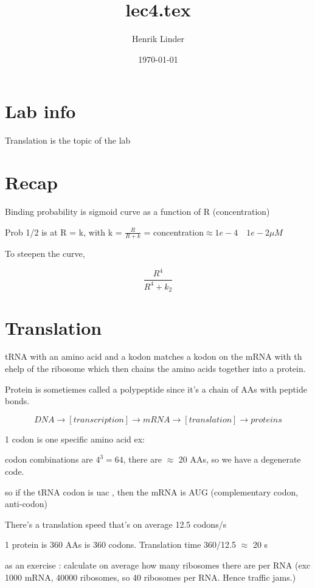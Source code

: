 \documentclass{article}
\title{lec4.tex }
\author{Henrik Linder}
\date{\today}
\begin{document}
\maketitle


\section{Lab info}
Translation is the topic of the lab 

\section{Recap}
Binding probability is sigmoid curve as a function of R (concentration)

Prob 1/2 is at R = k, with k = $\frac{R}{R + k}$ = concentration$\approx 1e-4 \quad 1e-2 \mu M$


To steepen the curve, 

\begin{equation}
	\frac{R ^ 4}{R ^ 4 + k_2}
\end{equation}



\section{Translation}
tRNA with an amino acid and a kodon matches a kodon on the mRNA with th ehelp of the ribosome which then chains the amino acids together into a protein. 


Protein is sometiemes called a polypeptide since it's a chain of AAs with peptide bonds. 

\begin{equation}
	DNA \longrightarrow [transcription] \longrightarrow mRNA \longrightarrow [translation] \longrightarrow proteins
\end{equation}

1 codon is one specific amino acid 
ex: 


codon combinations are $4^3 = 64$, there are $\approx$ 20 AAs, so we have a degenerate code. 

so if the tRNA codon is uac , then the mRNA is AUG (complementary codon, anti-codon)

There's a translation speed that's on average 12.5 codons/s

1 protein is 360 AAs is 360 codons. Translation time 360/12.5 $\approx$ 20 s

as an exercise : calculate on average how many ribosomes there are per RNA
(exc 1000 mRNA, 40000 ribosomes, so 40 ribosomes per RNA. Hence traffic jams.)
\end{document}
